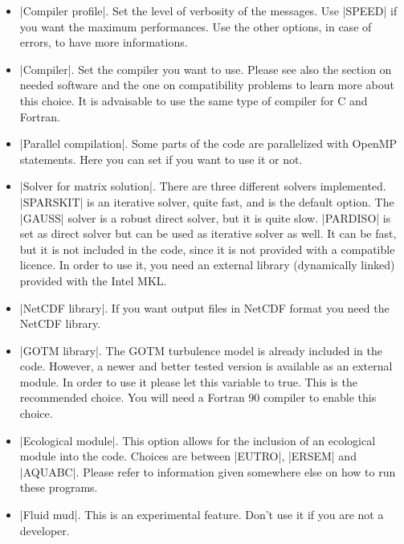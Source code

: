 \begin{itemize}

\item |Compiler profile|. Set the level of verbosity of the messages. Use
|SPEED| if you want the maximum performances. Use the other options, in
case of errors, to have more informations.

\item |Compiler|. Set the compiler you want to use. Please see also
the section on needed software and the one on compatibility problems to
learn more about this choice. It is advaisable to use the same type of
compiler for C and Fortran.

\item |Parallel compilation|. Some parts of the code are parallelized
with OpenMP statements. Here you can set if you want to use it or not.

\item |Solver for matrix solution|. There are three
different solvers implemented. |SPARSKIT| is an iterative solver, 
quite fast, and is the default option.
The |GAUSS| solver is a robust direct solver, but it is quite slow. 
|PARDISO| is set as direct solver but can be used as iterative
solver as well. It can be fast, but it is not included in the code,
since it is not provided with a compatible licence. In order to
use it, you need an external library (dynamically linked) provided 
with the Intel MKL.

\item |NetCDF library|. If you want output files in NetCDF format
you need the NetCDF library.

\item |GOTM library|. The GOTM turbulence model is already included in
the code. However, a newer and better tested version is available as an
external module. In order to use it please let this variable to true. This
is the recommended choice. You will need a Fortran 90 compiler to enable
this choice.

\item |Ecological module|. This option allows for the inclusion of an
ecological module into the code. Choices are between |EUTRO|, |ERSEM|
and |AQUABC|. Please refer to information given somewhere else on how
to run these programs.

\item |Fluid mud|. This is an experimental feature. Don't use it
if you are not a developer.

\end{itemize}

